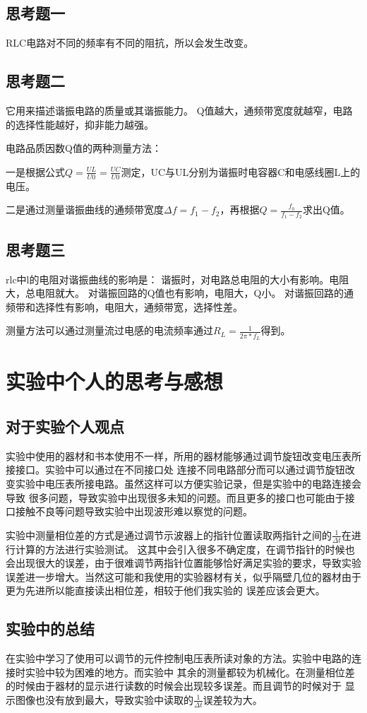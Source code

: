 \documentclass{ctexart}
\begin{document}
  \subsection{思考题一}
  RLC电路对不同的频率有不同的阻抗，所以会发生改变。
  \subsection{思考题二}
  它用来描述谐振电路的质量或其谐振能力。 
  Q值越大，通频带宽度就越窄，电路的选择性能越好，抑非能力越强。

  电路品质因数Q值的两种测量方法：
  
  一是根据公式$Q=\frac{UL}{U0}=\frac{UC}{U0}$测定，UC与UL分别为谐振时电容器C和电感线圈L上的电压。

  二是通过测量谐振曲线的通频带宽度$\Delta f=f_{1}-f_{2}$，再根据$Q=\frac{f_{0}}{f_{1}-f_{2}}$求出Q值。
  \subsection{思考题三}
  rlc中l的电阻对谐振曲线的影响是：
  谐振时，对电路总电阻的大小有影响。电阻大，总电阻就大。
  对谐振回路的Q值也有影响，电阻大，Q小。
  对谐振回路的通频带和选择性有影响，电阻大，通频带宽，选择性差。

  测量方法可以通过测量流过电感的电流频率通过$R_{L}=\frac{1}{2\pi * f_{L}}$得到。

\section{实验中个人的思考与感想}
  \subsection{对于实验个人观点}
  实验中使用的器材和书本使用不一样，所用的器材能够通过调节旋钮改变电压表所接接口。实验中可以通过在不同接口处
  连接不同电路部分而可以通过调节旋钮改变实验中电压表所接电路。虽然这样可以方便实验记录，但是实验中的电路连接会导致
  很多问题，导致实验中出现很多未知的问题。而且更多的接口也可能由于接口接触不良等问题导致实验中出现波形难以察觉的问题。

  实验中测量相位差的方式是通过调节示波器上的指针位置读取两指针之间的$\frac{1}{\Delta t}$在进行计算的方法进行实验测试。
  这其中会引入很多不确定度，在调节指针的时候也会出现很大的误差，由于很难调节两指针位置能够恰好满足实验的要求，导致实验
  误差进一步增大。当然这可能和我使用的实验器材有关，似乎隔壁几位的器材由于更为先进所以能直接读出相位差，相较于他们我实验的
  误差应该会更大。
  \subsection{实验中的总结}
  在实验中学习了使用可以调节的元件控制电压表所读对象的方法。实验中电路的连接时实验中较为困难的地方。而实验中
  其余的测量都较为机械化。在测量相位差的时候由于器材的显示进行读数的时候会出现较多误差。而且调节的时候对于
  显示图像也没有放到最大，导致实验中读取的$\frac{1}{\Delta t}$误差较为大。
\end{document}
